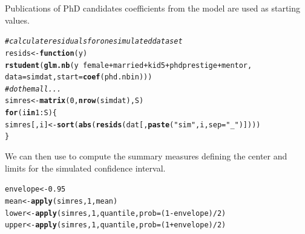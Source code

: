 \documentclass[11pt]{book}\usepackage[]{graphicx}\usepackage[]{color}
\makeatletter
\newcommand{\hlnum}[1]{\textcolor[rgb]{0.686,0.059,0.569}{#1}}%
\newcommand{\hlstr}[1]{\textcolor[rgb]{0.192,0.494,0.8}{#1}}%
\newcommand{\hlcom}[1]{\textcolor[rgb]{0.678,0.584,0.686}{\textit{#1}}}%
\newcommand{\hlopt}[1]{\textcolor[rgb]{0,0,0}{#1}}%
\newcommand{\hlstd}[1]{\textcolor[rgb]{0.345,0.345,0.345}{#1}}%
\newcommand{\hlkwa}[1]{\textcolor[rgb]{0.161,0.373,0.58}{\textbf{#1}}}%
\newcommand{\hlkwb}[1]{\textcolor[rgb]{0.69,0.353,0.396}{#1}}%
\newcommand{\hlkwc}[1]{\textcolor[rgb]{0.333,0.667,0.333}{#1}}%
\newcommand{\hlkwd}[1]{\textcolor[rgb]{0.737,0.353,0.396}{\textbf{#1}}}%
\newenvironment{kframe}{%
 \def\at@end@of@kframe{}%
 \ifinner\ifhmode%
  \def\at@end@of@kframe{\end{minipage}}%
  \begin{minipage}{\columnwidth}%
 \fi\fi%
 \def\FrameCommand##1{\hskip\@totalleftmargin \hskip-\fboxsep
 \colorbox{shadecolor}{##1}\hskip-\fboxsep
     \hskip-\linewidth \hskip-\@totalleftmargin \hskip\columnwidth}%
 \MakeFramed {\advance\hsize-\width
   \@totalleftmargin\z@ \linewidth\hsize
   \@setminipage}}%
 {\par\unskip\endMakeFramed%
 \at@end@of@kframe}
\newenvironment{knitrout}{}{} %
\renewenvironment{knitrout}{\small\renewcommand{\baselinestretch}{.85}}{} %
\makeatother
\begin{document}
\begin{Example}[phdpubs6]{Publications of PhD candidates}
coefficients from the  model are used as starting values.
\begin{knitrout}
\color{fgcolor}\begin{kframe}
\begin{alltt}
\hlcom{# calculate residuals for one simulated data set}
\hlstd{resids} \hlkwb{<-} \hlkwa{function}\hlstd{(}\hlkwc{y}\hlstd{)}
  \hlkwd{rstudent}\hlstd{(}\hlkwd{glm.nb}\hlstd{(y} \hlopt{~} \hlstd{female} \hlopt{+} \hlstd{married} \hlopt{+} \hlstd{kid5} \hlopt{+} \hlstd{phdprestige} \hlopt{+} \hlstd{mentor,}
                  \hlkwc{data}\hlstd{=simdat,} \hlkwc{start}\hlstd{=}\hlkwd{coef}\hlstd{(phd.nbin)))}
\hlcom{# do them all ...}
\hlstd{simres} \hlkwb{<-} \hlkwd{matrix}\hlstd{(}\hlnum{0}\hlstd{,} \hlkwd{nrow}\hlstd{(simdat), S)}
\hlkwa{for}\hlstd{(i} \hlkwa{in} \hlnum{1}\hlopt{:}\hlstd{S) \{}
        \hlstd{simres[,i]} \hlkwb{<-} \hlkwd{sort}\hlstd{(}\hlkwd{abs}\hlstd{(}\hlkwd{resids}\hlstd{(dat[,}\hlkwd{paste}\hlstd{(}\hlstr{"sim"}\hlstd{, i,} \hlkwc{sep}\hlstd{=}\hlstr{"_"}\hlstd{)])))}
\hlstd{\}}
\end{alltt}
\end{kframe}
\end{knitrout}
We can then use  to compute the summary measures defining the center and limits for the 
simulated confidence interval.
\begin{knitrout}
\color{fgcolor}\begin{kframe}
\begin{alltt}
\hlstd{envelope} \hlkwb{<-} \hlnum{0.95}
\hlstd{mean} \hlkwb{<-} \hlkwd{apply}\hlstd{(simres,} \hlnum{1}\hlstd{, mean)}
\hlstd{lower} \hlkwb{<-} \hlkwd{apply}\hlstd{(simres,} \hlnum{1}\hlstd{, quantile,} \hlkwc{prob}\hlstd{=(}\hlnum{1} \hlopt{-} \hlstd{envelope)}\hlopt{/}\hlnum{2}\hlstd{)}
\hlstd{upper} \hlkwb{<-} \hlkwd{apply}\hlstd{(simres,} \hlnum{1}\hlstd{, quantile,} \hlkwc{prob}\hlstd{=(}\hlnum{1} \hlopt{+} \hlstd{envelope)}\hlopt{/}\hlnum{2}\hlstd{)}
\end{alltt}
\end{kframe}
\end{knitrout}


\end{Example}
\end{document}
